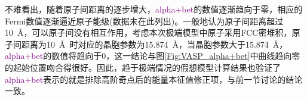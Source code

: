 不难看出，随着原子间距离的逐步增大，\textcolor{purple}{\textrm{alpha+bet}}的数值逐渐趋向于零，相应的\textrm{Fermi}数值逐渐逼近原子能级(数据未在此列出)。一般地认为原子间距离超过10~\AA ，可以原子间没有相互作用，考虑本次极端模型中原子采用\textrm{FCC}密堆积，原子间距离为10~\AA~时对应的晶胞参数为15.874~\AA ，当晶胞参数大于15.874~\AA ，\textcolor{purple}{\textrm{alpha+bet}}的数值将趋向于0，这一结论与图\ref{Fig:VASP_alpha+bet}中曲线趋向零的起始位置吻合得很好。因此，趋于极端情况的假想模型计算结果也验证了\textcolor{purple}{\textrm{alpha+bet}}表示的就是排除高阶奇点后的能量本征值修正项，与前一节讨论的结论一致。
